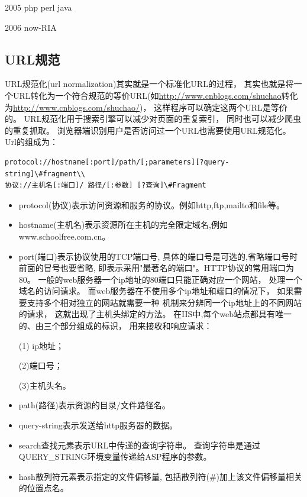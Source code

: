 \documentclass{book}
\begin{document}
2005 php perl java

2006 now-RIA

\clearpage
\mbox{}         
\clearpage

\subsection{URL规范}

URL规范化(url normalization)其实就是一个标准化URL的过程，
其实也就是将一个URL转化为一个符合规范的等价URL(如\url{http://www.cnblogs.com/shuchao}转化为\url{http://www.cnblogs.com/shuchao/})，
这样程序可以确定这两个URL是等价的。
URL规范化用于搜索引擎可以减少对页面的重复索引，
同时也可以减少爬虫的重复抓取。
浏览器端识别用户是否访问过一个URL也需要使用URL规范化。
Url的组成为：

\begin{lstlisting}
protocol://hostname[:port]/path/[;parameters][?query-string]\#fragment\\
协议://主机名[:端口]/ 路径/[:参数] [?查询]\#Fragment
\end{lstlisting}

\begin{itemize}
\item{protocol(协议)表示访问资源和服务的协议。例如http,ftp,mailto和file等。}
\item{hostname(主机名)表示资源所在主机的完全限定域名,例如www.schoolfree.com.cn。}
\item{port(端口)表示协议使用的TCP端口号,
具体的端口号是可选的,省略端口号时前面的冒号也要省略,
即表示采用"最著名的端口"。HTTP协议的常用端口为80。
一般的web服务器一个ip地址的80端口只能正确对应一个网站，
处理一个域名的访问请求。
而web服务器在不使用多个ip地址和端口的情况下，
如果需要支持多个相对独立的网站就需要一种
机制来分辨同一个ip地址上的不同网站的请求，
这就出现了主机头绑定的方法。
在IIS中,每个web站点都具有唯一的、由三个部分组成的标识，
用来接收和响应请求：

(1) ip地址；

(2)端口号；

(3)主机头名。}
\item{path(路径)表示资源的目录/文件路径名。}
\item{query-string表示发送给http服务器的数据。}
\item{search查找元素表示URL中传递的查询字符串。
查询字符串是通过QUERY\_STRING环境变量传递给ASP程序的参数。}
\item{hash散列符元素表示指定的文件偏移量,
包括散列符(\#)加上该文件偏移量相关的位置点名。}
\end{itemize}
\end{document}
